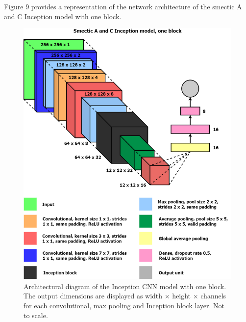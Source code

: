 \documentclass[12pt]{article}
\begin{document}
Figure 9 provides a representation of the network architecture of the smectic A and C Inception model with one block.
\begin{figure}[!htb]
	\centering
    \includegraphics[width=5.393in]{images/inception_model.png}
    \caption{Architectural diagram of the Inception CNN model with one block. The output dimensions are displayed as width $\times$ height $\times$ channels for each convolutional, max pooling and Inception block layer. Not to scale.}
\end{figure} 
\end{document}
